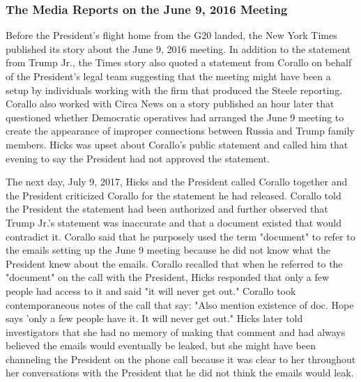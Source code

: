 \subsubsection{The Media Reports on the June 9, 2016 Meeting}

Before the President's flight home from the G20 landed, the New York Times published its story about the June 9, 2016 meeting.%
In addition to the statement from Trump Jr., the Times story also quoted a statement from Corallo on behalf of the President's legal team suggesting that the meeting might have been a setup by individuals working with the firm that produced the Steele reporting.%
Corallo also worked with Circa News on a story published an hour later that questioned whether Democratic operatives had arranged the June 9 meeting to create the appearance of improper connections between Russia and Trump family members.%
Hicks was upset about Corallo's public statement and called him that evening to say the President had not approved the statement.%

The next day, July 9, 2017, Hicks and the President called Corallo together and the President criticized Corallo for the statement he had released.%
Corallo told the President the statement had been authorized and further observed that Trump Jr.'s statement was inaccurate and that a document existed that would contradict it.%
Corallo said that he purposely used the term "document" to refer to the emails setting up the June 9 meeting because he did not know what the President knew about the emails.%
Corallo recalled that when he referred to the "document" on the call with the President, Hicks responded that only a few people had access to it and said "it will never get out."%
Corallo took contemporaneous notes of the call that say:
"Also mention existence of doc.
Hope says 'only a few people have it.
It will never get out."%
Hicks later told investigators that she had no memory of making that comment and had always believed the emails would eventually be leaked, but she might have been channeling the President on the phone call because it was clear to her throughout her conversations with the President that he did not think the emails would leak.%

